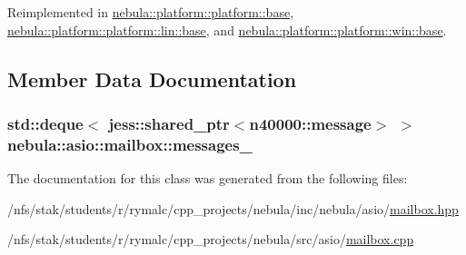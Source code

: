 Reimplemented in \hyperlink{classnebula_1_1platform_1_1platform_1_1base_a9036fffff86ce314d44ab292291088c9}{nebula::platform::platform::base}, \hyperlink{classnebula_1_1platform_1_1platform_1_1lin_1_1base_a2c85fc5372d292e5c79df69d07aefcd1}{nebula::platform::platform::lin::base}, and \hyperlink{classnebula_1_1platform_1_1platform_1_1win_1_1base_a89720e3bc6dee8af7f77469c8693596e}{nebula::platform::platform::win::base}.

\subsection{Member Data Documentation}
\hypertarget{classnebula_1_1asio_1_1mailbox_aa0919868c860545e0f123065df043e2f}{
\subsubsection[{messages\_\-}]{\setlength{\rightskip}{0pt plus 5cm}std::deque$<$ jess::shared\_\-ptr$<${\bf n40000::message}$>$ $>$ {\bf nebula::asio::mailbox::messages\_\-}}}
\label{classnebula_1_1asio_1_1mailbox_aa0919868c860545e0f123065df043e2f}


The documentation for this class was generated from the following files:\begin{DoxyCompactItemize}
\item 
/nfs/stak/students/r/rymalc/cpp\_\-projects/nebula/inc/nebula/asio/\hyperlink{mailbox_8hpp}{mailbox.hpp}\item 
/nfs/stak/students/r/rymalc/cpp\_\-projects/nebula/src/asio/\hyperlink{mailbox_8cpp}{mailbox.cpp}\end{DoxyCompactItemize}
